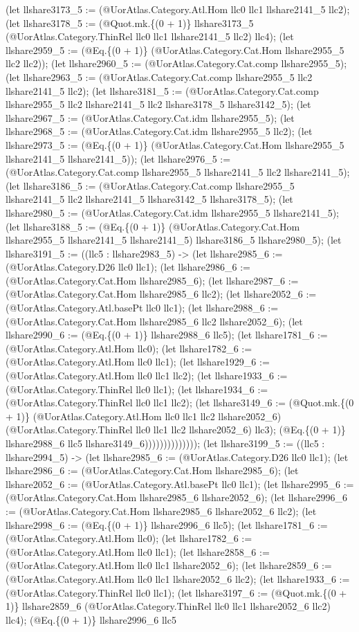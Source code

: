 \documentclass[11pt]{article}
\begin{document}
(let llshare3173\_5 := (@UorAtlas.Category.Atl.Hom llc0 llc1 llshare2141\_5 llc2); (let llshare3178\_5 := (@Quot.mk.\{(0 + 1)\} llshare3173\_5 (@UorAtlas.Category.ThinRel llc0 llc1 llshare2141\_5 llc2) llc4); (let llshare2959\_5 := (@Eq.\{(0 + 1)\} (@UorAtlas.Category.Cat.Hom llshare2955\_5 llc2 llc2)); (let llshare2960\_5 := (@UorAtlas.Category.Cat.comp llshare2955\_5); (let llshare2963\_5 := (@UorAtlas.Category.Cat.comp llshare2955\_5 llc2 llshare2141\_5 llc2); (let llshare3181\_5 := (@UorAtlas.Category.Cat.comp llshare2955\_5 llc2 llshare2141\_5 llc2 llshare3178\_5 llshare3142\_5); (let llshare2967\_5 := (@UorAtlas.Category.Cat.idm llshare2955\_5); (let llshare2968\_5 := (@UorAtlas.Category.Cat.idm llshare2955\_5 llc2); (let llshare2973\_5 := (@Eq.\{(0 + 1)\} (@UorAtlas.Category.Cat.Hom llshare2955\_5 llshare2141\_5 llshare2141\_5)); (let llshare2976\_5 := (@UorAtlas.Category.Cat.comp llshare2955\_5 llshare2141\_5 llc2 llshare2141\_5); (let llshare3186\_5 := (@UorAtlas.Category.Cat.comp llshare2955\_5 llshare2141\_5 llc2 llshare2141\_5 llshare3142\_5 llshare3178\_5); (let llshare2980\_5 := (@UorAtlas.Category.Cat.idm llshare2955\_5 llshare2141\_5); (let llshare3188\_5 := (@Eq.\{(0 + 1)\} (@UorAtlas.Category.Cat.Hom llshare2955\_5 llshare2141\_5 llshare2141\_5) llshare3186\_5 llshare2980\_5); (let llshare3191\_5 := ((llc5 : llshare2983\_5) -> (let llshare2985\_6 := (@UorAtlas.Category.D26 llc0 llc1); (let llshare2986\_6 := (@UorAtlas.Category.Cat.Hom llshare2985\_6); (let llshare2987\_6 := (@UorAtlas.Category.Cat.Hom llshare2985\_6 llc2); (let llshare2052\_6 := (@UorAtlas.Category.Atl.basePt llc0 llc1); (let llshare2988\_6 := (@UorAtlas.Category.Cat.Hom llshare2985\_6 llc2 llshare2052\_6); (let llshare2990\_6 := (@Eq.\{(0 + 1)\} llshare2988\_6 llc5); (let llshare1781\_6 := (@UorAtlas.Category.Atl.Hom llc0); (let llshare1782\_6 := (@UorAtlas.Category.Atl.Hom llc0 llc1); (let llshare1929\_6 := (@UorAtlas.Category.Atl.Hom llc0 llc1 llc2); (let llshare1933\_6 := (@UorAtlas.Category.ThinRel llc0 llc1); (let llshare1934\_6 := (@UorAtlas.Category.ThinRel llc0 llc1 llc2); (let llshare3149\_6 := (@Quot.mk.\{(0 + 1)\} (@UorAtlas.Category.Atl.Hom llc0 llc1 llc2 llshare2052\_6) (@UorAtlas.Category.ThinRel llc0 llc1 llc2 llshare2052\_6) llc3); (@Eq.\{(0 + 1)\} llshare2988\_6 llc5 llshare3149\_6)))))))))))))); (let llshare3199\_5 := ((llc5 : llshare2994\_5) -> (let llshare2985\_6 := (@UorAtlas.Category.D26 llc0 llc1); (let llshare2986\_6 := (@UorAtlas.Category.Cat.Hom llshare2985\_6); (let llshare2052\_6 := (@UorAtlas.Category.Atl.basePt llc0 llc1); (let llshare2995\_6 := (@UorAtlas.Category.Cat.Hom llshare2985\_6 llshare2052\_6); (let llshare2996\_6 := (@UorAtlas.Category.Cat.Hom llshare2985\_6 llshare2052\_6 llc2); (let llshare2998\_6 := (@Eq.\{(0 + 1)\} llshare2996\_6 llc5); (let llshare1781\_6 := (@UorAtlas.Category.Atl.Hom llc0); (let llshare1782\_6 := (@UorAtlas.Category.Atl.Hom llc0 llc1); (let llshare2858\_6 := (@UorAtlas.Category.Atl.Hom llc0 llc1 llshare2052\_6); (let llshare2859\_6 := (@UorAtlas.Category.Atl.Hom llc0 llc1 llshare2052\_6 llc2); (let llshare1933\_6 := (@UorAtlas.Category.ThinRel llc0 llc1); (let llshare3197\_6 := (@Quot.mk.\{(0 + 1)\} llshare2859\_6 (@UorAtlas.Category.ThinRel llc0 llc1 llshare2052\_6 llc2) llc4); (@Eq.\{(0 + 1)\} llshare2996\_6 llc5 
\end{document}
